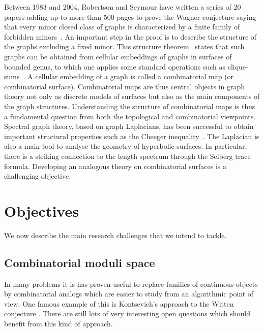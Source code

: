 \documentclass[14pt,fleqn]{article}
\begin{document}
Between 1983 and 2004, Robertson and Seymour have written a series of 20 papers adding up to more than 500 pages to prove the Wagner conjecture saying that every minor closed class of graphs is characterized by a finite family of forbidden minors~\cite{w-gt-70}.  An important step in the proof is to describe the structure of the graphs excluding a fixed minor. This structure theorem~\cite{rs-tv-99} states that such graphs can be obtained from cellular embeddings of graphs in surfaces of bounded genus, to which one applies some standard operations such as clique-sums~\cite{l-gmt-06}. A cellular embedding of a graph is called a combinatorial map (or combinatorial surface). Combinatorial maps are thus central objects in graph theory not only as discrete models of surfaces but also as the main components of the graph structures. Understanding the structure of combinatorial maps is thus a fundamental question from both the topological and combinatorial viewpoints. Spectral graph theory, based on graph Laplacians, has been successful to obtain important structural properties such as the Cheeger inequality~\cite{c-lbsel-70}. The Laplacian is also a main tool to analyse the geometry of hyperbolic surfaces. In particular, there is a striking connection to the length spectrum through the Selberg trace formula. Developing an analogous theory on combinatorial surfaces is a challenging objective.




\section{Objectives}
We now describe the main research challenges that we intend to tackle. 

\subsection{Combinatorial moduli space}

In many problems
it is has proven useful 
to replace families of continuous objects
by combinatorial analogs
which are easier to study from an algorithmic point of view.
One famous example of this
is Kontsevich's approach to the Witten 
conjecture \cite{kontsevich1992}.
There are still lots of 
very interesting open questions
 which should benefit
from this kind of approach.
\end{document}
